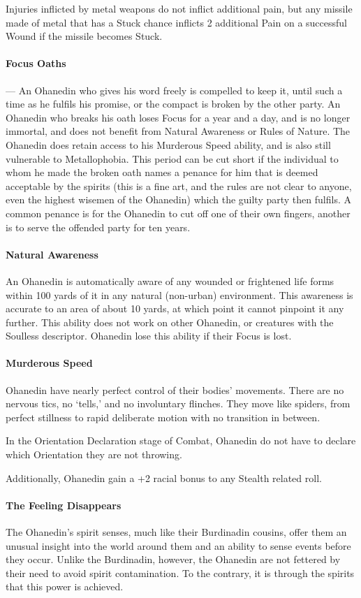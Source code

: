 \documentclass[oneside,11pt,english]{book}
\begin{document}
Injuries inflicted by metal weapons do not inflict additional pain, but any missile made of metal that has a Stuck chance inflicts 2 additional Pain on a successful Wound if the missile becomes Stuck. 
\paragraph{Focus Oaths}---\quad
An Ohanedin who gives his word freely is compelled to keep it, until such a time as he fulfils his 
promise, or the compact is broken by the other party. An Ohanedin who breaks his oath loses 
Focus for a year and a day, and is no longer immortal, and does not benefit from Natural 
Awareness or Rules of Nature. The Ohanedin does retain access to his Murderous Speed ability, 
and is also still vulnerable to Metallophobia. This period can be cut short if the individual to 
whom he made the broken oath names a penance for him that is deemed acceptable by the spirits 
(this is a fine art, and the rules are not clear to anyone, even the highest wisemen of the 
Ohanedin) which the guilty party then fulfils. A common penance is for the Ohanedin to cut off 
one of their own fingers, another is to serve the offended party for ten years. 
\paragraph{Natural Awareness}
An Ohanedin is automatically aware of any wounded or frightened life forms within 100 yards of 
it in any natural (non-urban) environment. This awareness is accurate to an area of about 10 
yards, at which point it cannot pinpoint it any further. This ability does not work on other 
Ohanedin, or creatures with the Soulless descriptor. Ohanedin lose this ability if their Focus is lost. 
\paragraph{Murderous Speed}
Ohanedin have nearly perfect control of their bodies' movements. There are no nervous tics, no 
‘tells,’ and no involuntary flinches. They move like spiders, from perfect stillness to rapid 
deliberate motion with no transition in between. 

In the Orientation Declaration stage of Combat, Ohanedin do not have to declare which Orientation they are not throwing.

Additionally, Ohanedin gain a +2 racial bonus to any Stealth related roll. 
\paragraph{The Feeling Disappears}
The Ohanedin's spirit senses, much like their Burdinadin cousins, offer them an unusual insight 
into the world around them and an ability to sense events before they occur. Unlike the Burdinadin, however, the Ohanedin are not fettered by their need to avoid spirit contamination. 
To the contrary, it is through the spirits that this power is achieved. 
\end{document}
